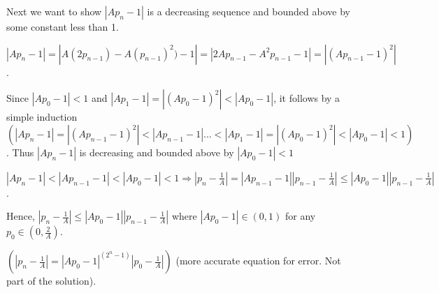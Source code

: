 \documentclass[10pt]{article}
\begin{document}
\begin{enumerate}[label=\bfseries Problem \arabic*:]
\begin{itemize}
    Next we want to show $|Ap_n-1|$ is a decreasing sequence and bounded above by some constant less than 1.\par
    $|Ap_n-1|=|A(2p_{n-1})-A(p_{n-1})^2)-1|=|2Ap_{n-1}-A^2p_{n-1}-1|=|(Ap_{n-1}-1)^2|$.\par
    Since $|Ap_0-1|<1$ and $|Ap_1-1|=|(Ap_0-1)^2|<|Ap_0-1|$, it follows by a simple induction $(|Ap_n-1|=|(Ap_{n-1}-1)^2|<|Ap_{n-1}-1|...<|Ap_1-1|=|(Ap_0-1)^2|<|Ap_0-1|<1)$.
    Thus $|Ap_n-1|$ is decreasing and bounded above by $|Ap_0-1|<1$\par 
    $|Ap_n-1|<|Ap_{n-1}-1|<|Ap_0-1|<1\Rightarrow |p_n-\frac{1}{A}|=|Ap_{n-1}-1||p_{n-1}-\frac{1}{A}|\le |Ap_0-1||p_{n-1}-\frac{1}{A}|$.\par 
    Hence, $|p_n-\frac{1}{A}|\le|Ap_0-1||p_{n-1}-\frac{1}{A}|$ where $|Ap_0-1|\in(0,1)$ for any $p_0\in(0,\frac{2}{A})$.\par
    $(|p_n-\frac{1}{A}|=|Ap_0-1|^{(2^n-1)}|p_0-\frac{1}{A}|)$ (more accurate equation for error. Not part of the solution).
\end{itemize}





\end{enumerate}
\end{document}
